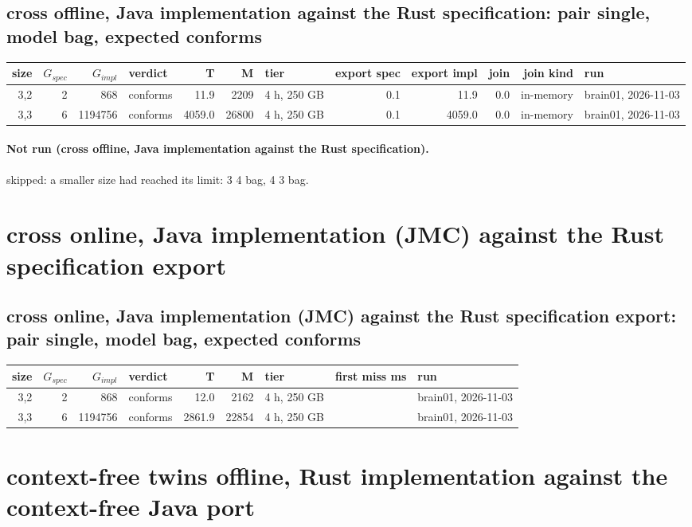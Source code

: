 \documentclass[10pt]{article}
\begin{document}
\subsection*{cross offline, Java implementation against the Rust specification: pair \textsf{single}, model bag, expected conforms}
\begin{longtable}{@{}rrrlrrlrrrrl@{}}
\toprule
size & $G_{\mathit{spec}}$ & $G_{\mathit{impl}}$ & verdict & T & M & tier & export spec & export impl & join & join kind & run \\
\midrule
\endhead
\color{red} 3,2 & 2 & 868 & conforms & 11.9 & 2209 & 4 h, 250 GB & 0.1 & 11.9 & 0.0 & in-memory & brain01, 2026-11-03 \\
\color{red} 3,3 & 6 & 1194756 & conforms & 4059.0 & 26800 & 4 h, 250 GB & 0.1 & 4059.0 & 0.0 & in-memory & brain01, 2026-11-03 \\
\bottomrule
\end{longtable}
\paragraph{Not run (cross offline, Java implementation against the Rust specification).}
skipped: a smaller size had reached its limit: 3 4 bag, 4 3 bag.\par
\section*{cross online, Java implementation (JMC) against the Rust specification export}
\subsection*{cross online, Java implementation (JMC) against the Rust specification export: pair \textsf{single}, model bag, expected conforms}
\begin{longtable}{@{}rrrlrrlrl@{}}
\toprule
size & $G_{\mathit{spec}}$ & $G_{\mathit{impl}}$ & verdict & T & M & tier & first miss ms & run \\
\midrule
\endhead
\color{red} 3,2 & 2 & 868 & conforms & 12.0 & 2162 & 4 h, 250 GB &  & brain01, 2026-11-03 \\
\color{red} 3,3 & 6 & 1194756 & conforms & 2861.9 & 22854 & 4 h, 250 GB &  & brain01, 2026-11-03 \\
\bottomrule
\end{longtable}
\section*{context-free twins offline, Rust implementation against the context-free Java port}
\end{document}
